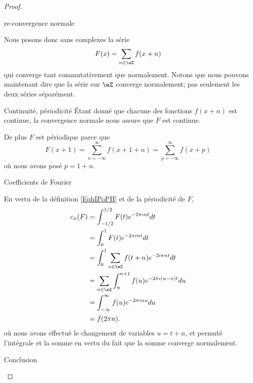 \begin{proof}
\begin{subproof}
    \item[re-convergence normale]

        Nous posons donc sans complexes la série
        \begin{equation}
            F(x)=\sum_{n\in \eZ}f(x+n)
        \end{equation}
        qui converge tant commutativement que normalement. Notons que nous pouvons maintenant dire que la série sur \( \eZ\) converge normalement; pas seulement les deux séries séparément.

    \item[Continuité, périodicité]
        Étant donné que chacune des fonctions \( f(x+n)\) est continue, la convergence normale nous assure que \( F\) est continue.

        De plus \( F\) est périodique parce que
        \begin{equation}
            F(x+1)=\sum_{n=-\infty}^{\infty}f(x+1+n)=\sum_{p=-\infty}^{\infty}f(x+p)
        \end{equation}
        où nous avons posé \( p=1+n\).
        
    \item[Coefficients de Fourier]

        En vertu de la définition \eqref{EqhIPoPH} et de la périodicité de \( F\),
        \begin{subequations}
            \begin{align}
                c_n(F)&=\int_{-1/2}^{1/2}F(t) e^{-2\pi int}dt\\
                &=\int_0^1F(t) e^{-2\pi int}dt\\
                &=\int_0^1\sum_{n\in \eZ}f(t+n) e^{-2 i\pi nt}dt\\
                &=\sum_{n\in \eZ}\int_n^{n+1}f(u) e^{-2\pi i (u-n)t}du\\
                &=\int_{-\infty}^{\infty}f(u) e^{-2\pi inu}du\\
                &=\hat f(2\pi n).
            \end{align}
        \end{subequations}
        où nous avons effectué le changement de variables \( u=t+n\), et permuté l'intégrale et la somme en vertu du fait que la somme converge normalement.

    \item[Conclusion]


\end{subproof}
\end{proof}
